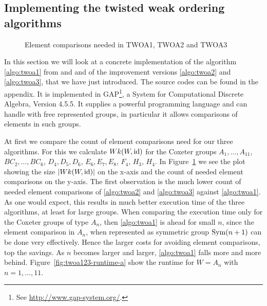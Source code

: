\subsection{Implementing the twisted weak ordering algorithms}
\label{sec:implementing-twisted-involutions-algorithms}

\begin{figure}[ht]
	\centering
	\caption{Element comparisons needed in TWOA1, TWOA2 and TWOA3}
	\label{fig:twoa123-element-comparisons}
\end{figure}

In this section we will look at a concrete implementation of the algorithm \ref{algo:twoa1} from \cite{brennemann:twoa} and \cite{haas:twoa} and of the improvement versions \ref{algo:twoa2} and \ref{algo:twoa3}, that we have just introduced. The source codes can be found in the appendix. It is implemented in GAP\footnote{See \url{http://www.gap-system.org/}.}, a System for Computational Discrete Algebra, Version 4.5.5. It supplies a powerful programming language and can handle with free represented groups, in particular it allows comparisons of elements in such groups. 

At first we compare the count of element comparisons need for our three algorithms. For this we calculate $Wk(W,\operatorname{id})$ for the Coxeter groups $A_1,\ldots,A_{11}$, $BC_2,\ldots,BC_6$, $D_4,D_5,D_6$, $E_6,E_7,E_8$, $F_4$, $H_3$, $H_4$. In Figure~\ref{fig:twoa123-element-comparisons} we see the plot showing the size $|Wk(W,\operatorname{id})|$ on the x-axis and the count of needed element comparisons on the y-axis. The first observation is the much lower count of needed element comparisons of \ref{algo:twoa2} and \ref{algo:twoa3} against \ref{algo:twoa1}. As one would expect, this results in much better execution time of the three algorithms, at least for large groups. When comparing the execution time only for the Coxeter groups of type $A_n$, then \ref{algo:twoa1} is ahead for small $n$, since the element comparison in $A_n$, when represented as symmetric group $\operatorname{Sym}(n+1)$ can be done very effectively. Hence the larger costs for avoiding element comparisons, top the savings. As $n$ becomes larger and larger, \ref{algo:twoa1} falls more and more behind. Figure~\ref{fig:twoa123-runtime-a} show the runtime for $W=A_n$ with $n=1,\dots,11$.

